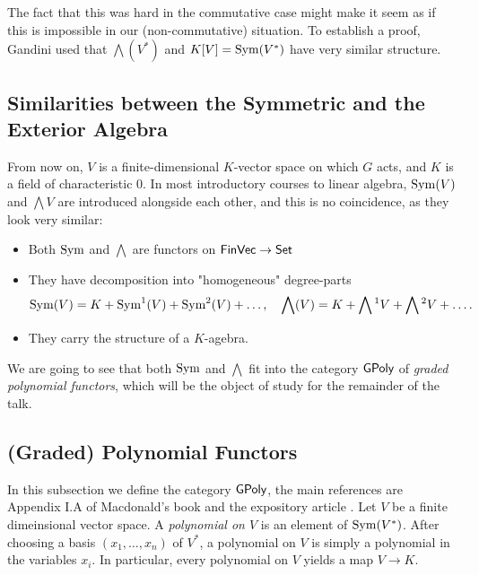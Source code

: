 \documentclass[../main.tex]{subfiles}
\begin{document}
The fact that this was hard in the commutative
case might make it seem as if this is impossible in our (non-commutative)
situation. To establish a proof, Gandini used that 
$\bigwedge(V^*)$ and $K[V] = \operatorname{Sym}(V^*)$ have very similar structure. 

\subsection{Similarities between the Symmetric and the Exterior Algebra} %
\label{sub:Similarities between the symmetric and the exterior algebra}
From now on, $V$ is a finite-dimensional $K$-vector space on which 
$G$ acts, and $K$ is a field of characteristic $0$.
In most introductory courses to linear algebra, $\operatorname{Sym}(V)$ and $\bigwedge V$ are
introduced alongside each other, and this is no coincidence, as they look very
similar:
\begin{itemize}[wide,labelindent=0pt]
    \item Both $\operatorname{Sym}$ and $\bigwedge$ are functors on $\textnormal{$\textsf{FinVec}$} \to \textnormal{$\textsf{Set}$}$
    \item They have decomposition into "homogeneous" degree-parts 
        \begin{equation*}
            \operatorname{Sym}(V) = K + \operatorname{Sym}^1(V) + \operatorname{Sym}^2(V) + \dots, \quad \bigwedge(V) =
            K + \bigwedge{}^1V + \bigwedge{}^2V + \dots.
        \end{equation*}
    \item They carry the structure of a $K$-agebra.
\end{itemize}
We are going to see that both $\operatorname{Sym}$ and $\bigwedge$ fit into the category $\textnormal{$\textsf{GPoly}$}$ of 
\emph{graded polynomial functors}, which will be the object of study for the remainder
of the talk.

\subsection{(Graded) Polynomial Functors}
In this subsection we define the category $\textnormal{$\textsf{GPoly}$}$, the main references are 
Appendix I.A of Macdonald's book \cite{macdonald1998symmetric} and the expository
article \cite{sam2012introduction}.
Let $V$ be a finite dimeinsional vector space. A \emph{polynomial on $V$}
is an element of $\operatorname{Sym}(V^*)$. After choosing a basis $(x_1, \dots, x_n)$ of 
$V^*$, a polynomial on $V$ is simply a polynomial in the variables $x_i$. In particular,
every polynomial on $V$ yields a map $V \to K$.
\end{document}
